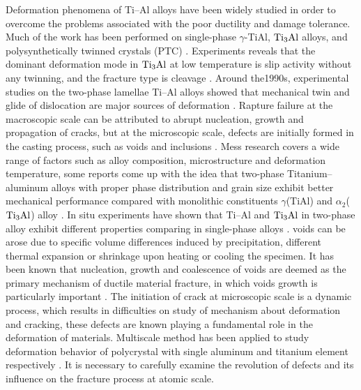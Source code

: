 \documentclass[materials,article,accept,moreauthors,pdftex,10pt,a4paper]{Definitions/mdpi}
\begin{document}
Deformation phenomena of Ti--Al alloys have been widely studied in order to overcome the problems associated with the poor ductility and damage tolerance.  Much of the work has been performed on single-phase $\gamma$-TiAl, $\rm{Ti_3Al}$ alloys, and polysynthetically twinned crystals (PTC) \cite{Appel2016}. Experiments reveals that  the dominant deformation mode in $\rm{Ti_3Al}$ at low temperature is slip activity without any twinning, and the fracture type is cleavage \cite{sastry1980plastic}. Around  the1990s, experimental studies on the two-phase lamellae Ti--Al alloys showed that  mechanical twin and glide of  dislocation are major sources of deformation \cite{Farenc1993,Appel2005,Appel1998a}. Rapture failure at the macroscopic scale can be attributed to abrupt nucleation, growth and propagation of cracks, but at the microscopic scale, defects are initially formed in the casting process, such as voids and inclusions \cite{Tang2014}. Mess research  covers a wide range of factors such as alloy composition, microstructure and deformation temperature, some reports come up with the idea that two-phase Titanium--aluminum alloys with proper phase distribution and grain size exhibit better mechanical performance compared with monolithic constituents $\gamma$(TiAl) and $\alpha_2$($\rm Ti_3Al$) alloy \cite{Kim1995}. In situ experiments have shown that Ti--Al and $\rm{Ti_3Al}$ in two-phase alloy exhibit different properties comparing in single-phase alloys \cite{Singh2006}. voids can be arose due to specific volume differences induced by precipitation, different thermal expansion or shrinkage upon heating or cooling the specimen. It has been known that nucleation, growth and coalescence of voids are deemed as the primary mechanism of ductile material fracture, in which voids growth is particularly important \cite{Hempel2017a}. The initiation of crack at microscopic scale is a dynamic process, which results in difficulties on study of  mechanism about deformation and cracking, these defects are known playing a fundamental role in the deformation of materials. Multiscale method has been applied to study deformation behavior of polycrystal with single aluminum \cite{Groh2009} and titanium element respectively \cite{Liu2018}. It is necessary to carefully examine the revolution of defects and its influence on the fracture process at atomic scale.
\end{document}
